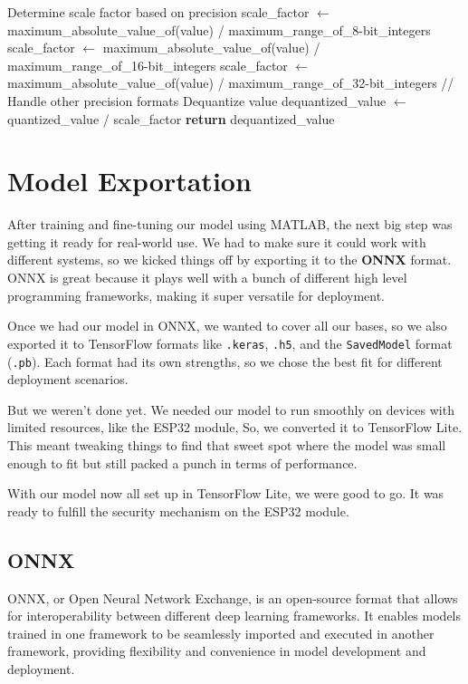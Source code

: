 \documentclass[a4paper]{report}
\begin{document}
{\begin{algorithm}
\begin{algorithmic}[1]
\Statex

    \State Determine scale factor based on precision
        \State scale\_factor $\gets$ maximum\_absolute\_value\_of(value) / maximum\_range\_of\_8-bit\_integers
        \State scale\_factor $\gets$ maximum\_absolute\_value\_of(value) / maximum\_range\_of\_16-bit\_integers
        \State scale\_factor $\gets$ maximum\_absolute\_value\_of(value) / maximum\_range\_of\_32-bit\_integers
    \Else
        \State // Handle other precision formats
    \EndIf
    \State Dequantize value
    \State dequantized\_value $\gets$ quantized\_value / scale\_factor
    \State \textbf{return} dequantized\_value
\EndFunction
\end{algorithmic}
\end{algorithm}
\newpage
\section{Model Exportation}
After training and fine-tuning our model using MATLAB, the next big step was getting it ready for real-world use. We had to make sure it could work with different systems, so we kicked things off by exporting it to the \textbf{ONNX} format. ONNX is great because it plays well with a bunch of different high level programming frameworks, making it super versatile for deployment.

Once we had our model in ONNX, we wanted to cover all our bases, so we also exported it to TensorFlow formats like \texttt{.keras}, \texttt{.h5}, and the \texttt{SavedModel} format (\texttt{.pb}). Each format had its own strengths, so we chose the best fit for different deployment scenarios.

But we weren't done yet. We needed our model to run smoothly on devices with limited resources, like the ESP32 module, So, we converted it to TensorFlow Lite. This meant tweaking things to find that sweet spot where the model was small enough to fit but still packed a punch in terms of performance.

With our model now all set up in TensorFlow Lite, we were good to go. It was ready to fulfill the security mechanism on the ESP32 module.
\subsection{ONNX}
ONNX, or Open Neural Network Exchange, is an open-source format that allows for interoperability between different deep learning frameworks. It enables models trained in one framework to be seamlessly imported and executed in another framework, providing flexibility and convenience in model development and deployment.

}
\end{document}

